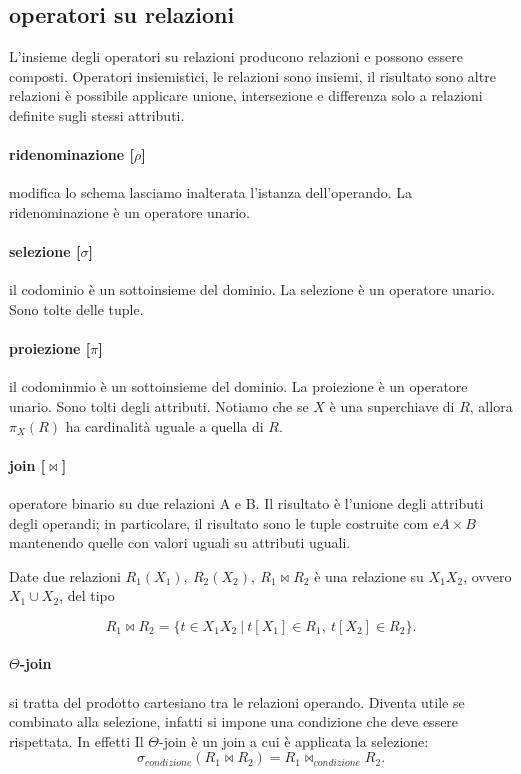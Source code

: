 \documentclass{article}
\begin{document}
\subsection{operatori su relazioni}
L'insieme degli operatori su relazioni producono relazioni e possono essere
composti. Operatori insiemistici, le relazioni sono insiemi, il risultato sono
altre relazioni è possibile applicare unione, intersezione e differenza solo a
relazioni definite sugli stessi attributi.

\paragraph{ridenominazione [$\rho$]} modifica lo schema lasciamo inalterata l'istanza
dell'operando. La ridenominazione è un operatore unario.

\paragraph{selezione [$\sigma$]} il codominio è un sottoinsieme del dominio. La selezione è
un operatore unario. Sono tolte delle tuple.

\paragraph{proiezione [$\pi$]} il codominmio è un sottoinsieme del dominio. La
proiezione è un operatore unario. Sono tolti degli attributi.
Notiamo che se $X$ è una superchiave di $R$, allora $\pi_X(R)$ ha cardinalità
uguale a quella di $R$.

\paragraph{join [$\bowtie$]} operatore binario su due relazioni A e B. Il risultato è
l'unione degli attributi degli operandi; in particolare, il risultato sono le
tuple costruite com e$A \times B$ mantenendo quelle con valori uguali su
attributi uguali.

Date due relazioni $R_1(X_1), \ R_2(X_2), \ R_1 \bowtie R_2$ è una relazione su
$X_1X_2$, ovvero $X_1 \cup X_2$, del tipo 

\begin{equation}
	R_1 \bowtie R_2 = \{t \in X_1X_2 \ | \ t[X_1] \in R_1, \ t[X_2] \in R_2\}.
\end{equation}

\paragraph{$\Theta$-join} si tratta del prodotto cartesiano tra le relazioni
operando. Diventa utile se combinato alla selezione, infatti si impone una
condizione che deve essere rispettata. In effetti Il $\Theta$-join è un
join a cui è applicata la selezione:
\begin{equation}
	\sigma_{condizione}(R_1 \bowtie R_2) = R_1 \bowtie_{condizione} R_2.
\end{equation}
\end{document}

